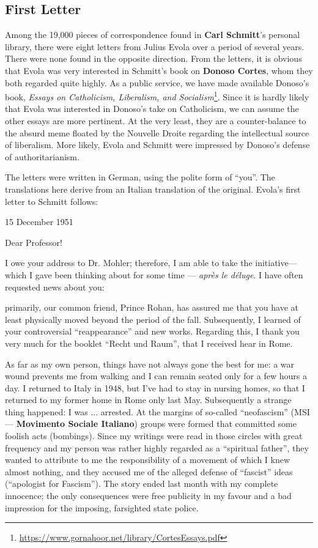 \subsection{First Letter}

\begin{quotex}
Among the 19,000 pieces of correspondence found in \textbf{Carl Schmitt}'s personal library, there were eight letters from Julius Evola over a period of several years. There were none found in the opposite direction. From the letters, it is obvious that Evola was very interested in Schmitt's book on \textbf{Donoso Cortes}, whom they both regarded quite highly. As a public service, we have made available Donoso's book, \textit{Essays on Catholicism, Liberalism, and Socialism}\footnote{\url{https://www.gornahoor.net/library/CortesEssays.pdf}}. Since it is hardly likely that Evola was interested in Donoso's take on Catholicism, we can assume the other essays are more pertinent. At the very least, they are a counter-balance to the absurd meme floated by the Nouvelle Droite regarding the intellectual source of liberalism. More likely, Evola and Schmitt were impressed by Donoso's defense of authoritarianism.

The letters were written in German, using the polite form of ``you''. The translations here derive from an Italian translation of the original. Evola's first letter to Schmitt follows:
\end{quotex}


15 December 1951

Dear Professor!

I owe your address to Dr. Mohler; therefore, I am able to take the initiative---which I gave been thinking about for some time --- \emph{après le déluge}. I have often requested news about you:

primarily, our common friend, Prince Rohan, has assured me that you have at least physically moved beyond the period of the fall. Subsequently, I learned of your controversial ``reappearance'' and new works. Regarding this, I thank you very much for the booklet ``Recht und Raum'', that I received hear in Rome.

As far as my own person, things have not always gone the best for me: a war wound prevents me from walking and I can remain seated only for a few hours a day. I returned to Italy in 1948, but I've had to stay in nursing homes, so that I returned to my former home in Rome only last May. Subsequently a strange thing happened: I was ... arrested. At the margins of so-called ``neofascism'' (MSI --- \textbf{Movimento Sociale Italiano}) groups were formed that committed some foolish acts (bombings). Since my writings were read in those circles with great frequency and my person was rather highly regarded as a ``spiritual father'', they wanted to attribute to me the responsibility of a movement of which I knew almost nothing, and they accused me of the alleged defense of ``fascist'' ideas (``apologist for Fascism''). The story ended last month with my complete innocence; the only consequences were free publicity in my favour and a bad impression for the imposing, farsighted state police.

